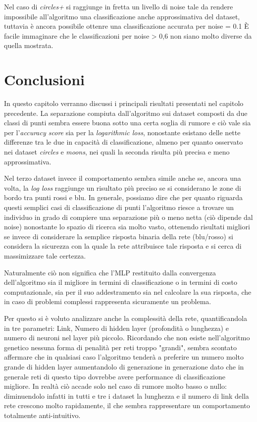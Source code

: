\documentclass[12pt,a4paper]{report}
\begin{document}
Nel caso di \textit{circles+} si raggiunge in fretta un livello di noise tale da rendere impossibile all'algoritmo una classificazione anche approssimativa del dataset, tuttavia è ancora possibile ottenre una classificazione accurata per noise = 0.1
È facile immaginare che le classificazioni per noise > 0,6 non siano molto diverse da quella mostrata.

\chapter{Conclusioni}

In questo capitolo verranno discussi i principali risultati presentati nel capitolo precedente.
La separazione compiuta dall'algoritmo sui dataset composti da due classi di punti sembra essere buona sotto una certa soglia di rumore e ciò vale sia per l'\textit{accuracy score} sia per la \textit{logarithmic loss}, nonostante esistano delle nette differenze tra le due in capacità di classificazione, almeno per quanto osservato nei dataset \textit{circles} e \textit{moons}, nei quali la seconda risulta più precisa e meno approssimativa. 

Nel terzo dataset invece il comportamento sembra simile anche se, ancora una volta, la \textit{log loss} raggiunge un risultato più preciso se si considerano le zone di bordo tra punti rossi e blu. 
In generale, possiamo dire che per quanto riguarda questi semplici casi di classificazione di punti l'algoritmo riesce a trovare un individuo in grado di compiere una separazione più o meno netta (ciò dipende dal noise) nonostante lo spazio di ricerca sia molto vasto, ottenendo risultati migliori se invece di considerare la semplice risposta binaria della rete (blu/rosso) si considera la sicurezza con la quale la rete attribuisce tale risposta e si cerca di massimizzare tale certezza.

Naturalmente ciò non significa che l'MLP restituito dalla convergenza dell'algoritmo sia il migliore in termini di classificazione o in termini di costo computazionale, sia per il suo addestramento sia nel calcolare la sua risposta, che in caso di problemi complessi rappresenta sicuramente un problema. 

Per questo si è voluto analizzare anche la complessità della rete, quantificandola in tre parametri: Link, Numero di hidden layer (profondità o lunghezza) e numero di neuroni nel layer più piccolo.
Ricordando che non esiste nell'algoritmo genetico nessuna forma di penalità per reti troppo "grandi", sembra scontato affermare che in qualsiasi caso l'algoritmo tenderà a preferire un numero molto grande di hidden layer aumentandolo di generazione in generazione dato che in generale reti di questo tipo dovrebbe avere performance di classificazione migliore.
In realtà ciò accade solo nel caso di rumore molto basso o nullo: diminuendolo infatti in tutti e tre i dataset la lunghezza e il numero di link della rete crescono molto rapidamente, il che sembra rappresentare un comportamento totalmente anti-intuitivo. 
\end{document}

